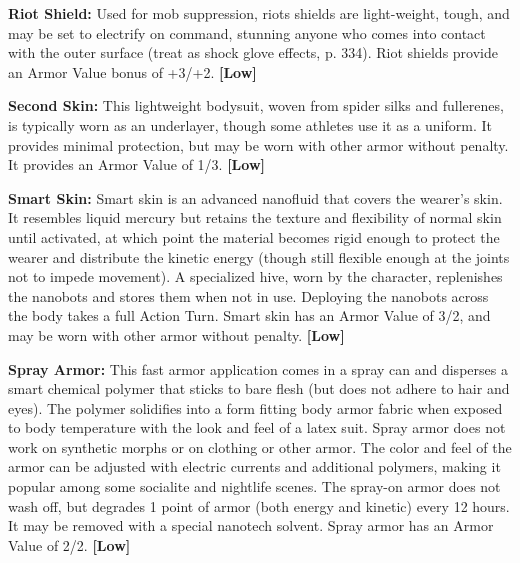 \textbf{Riot Shield:} Used for mob suppression, riots shields are light-weight, tough, and may be set to electrify on command, stunning anyone who comes into contact with the outer surface (treat as shock glove effects, p. 334). Riot shields provide an Armor Value bonus of +3/+2. \textbf{[Low]}

\textbf{Second Skin:} This lightweight bodysuit, woven from spider silks and fullerenes, is typically worn as an underlayer, though some athletes use it as a uniform. It provides minimal protection, but may be worn with other armor without penalty. It provides an Armor Value of 1/3. \textbf{[Low]}

\textbf{Smart Skin:} Smart skin is an advanced nanofluid that covers the wearer’s skin. It resembles liquid mercury but retains the texture and flexibility of normal skin until activated, at which point the material becomes rigid enough to protect the wearer and distribute the kinetic energy (though still flexible enough at the joints not to impede movement). A specialized hive, worn by the character, replenishes the nanobots and stores them when not in use. Deploying the nanobots across the body takes a full Action Turn. Smart skin has an Armor Value of 3/2, and may be worn with other armor without penalty. \textbf{[Low]}

\textbf{Spray Armor:} This fast armor application comes in a spray can and disperses a smart chemical polymer that sticks to bare flesh (but does not adhere to hair and eyes). The polymer solidifies into a form fitting body armor fabric when exposed to body temperature with the look and feel of a latex suit. Spray armor does not work on synthetic morphs or on clothing or other armor. The color and feel of the armor can be adjusted with electric currents and additional polymers, making it popular among some socialite and nightlife scenes. The spray-on armor does not wash off, but degrades 1 point of armor (both energy and kinetic) every 12 hours. It may be removed with a special nanotech solvent. Spray armor has an Armor Value of 2/2. \textbf{[Low]}

